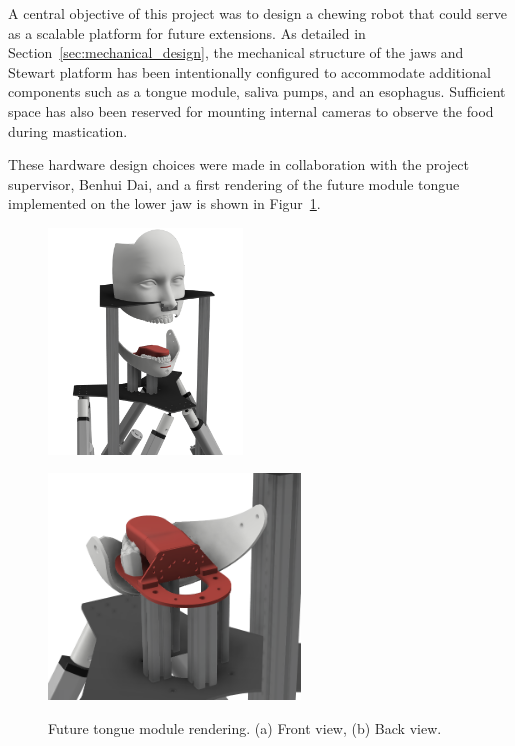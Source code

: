 A central objective of this project was to design a chewing robot that could serve as a scalable platform for future extensions. As detailed in Section~\ref{sec:mechanical_design}, 
the mechanical structure of the jaws and Stewart platform has been intentionally configured to accommodate additional components such as a tongue module, saliva pumps, and an 
esophagus. Sufficient space has also been reserved for mounting internal cameras to observe the food during mastication.

These hardware design choices were made in collaboration with the project supervisor, Benhui Dai, and a first rendering of the future module tongue implemented on the lower jaw is shown in Figur~\ref{fig:tongue}.

\begin{figure}[H]
\centering
\begin{minipage}{.45\textwidth}
  \centering
  \includegraphics[height=6cm]{figures/tongue_front.png}
  \subcaption{}
  \label{fig:tongue_front}
\end{minipage}
\begin{minipage}{.45\textwidth}
  \centering
  \includegraphics[height=6cm]{figures/tongue_back.png}
  \subcaption{}
  \label{fig:tongue_back}
\end{minipage}
\caption{Future tongue module rendering. (a) Front view, (b) Back view. }
\label{fig:tongue}
\end{figure}

